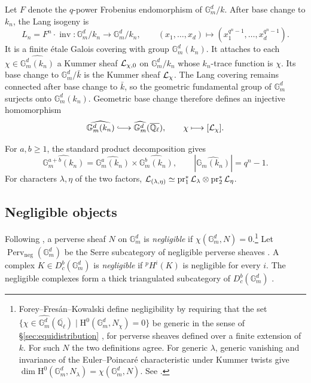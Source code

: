 \documentclass[12pt,reqno]{amsart}
\theoremstyle{definition}
\theoremstyle{plain}
\theoremstyle{definition}
\theoremstyle{remark}
\newcommand{\bbG}{\mathbb{G}}  \newcommand{\bbH}{\mathbb{H}}
\newcommand{\bbQ}{\mathbb{Q}}  \newcommand{\bbR}{\mathbb{R}}
\newcommand{\HH}{\mathrm{H}}  \newcommand{\JJ}{\mathrm{J}}
\newcommand{\ol}[1]{\overline{#1}}
\newcommand{\Ql}{\bbQ_{\ell}}
\newcommand{\Db}{D^b_c}
\newcommand{\Gm}{\bbG_m}
\newcommand{\Perv}{\operatorname{Perv}}
\begin{document}
Let \(F\) denote the \(q\)-power Frobenius endomorphism of \(\Gm^d/k\).  After base change to \(k_n\), the
Lang isogeny is
\[
        L_n=F^n\cdot\operatorname{inv}\colon\Gm^d/k_n\longrightarrow\Gm^d/k_n,
        \qquad
        (x_1,\ldots,x_d)\longmapsto(x_1^{q^n-1},\ldots,x_d^{q^n-1}).
\]
It is a finite \'etale Galois covering with group \(\Gm^d(k_n)\).  It attaches to each
\(\chi\in\widehat{\Gm^d(k_n)}\) a Kummer sheaf \(\mathcal{L}_{\chi,0}\) on \(\Gm^d/k_n\) whose \(k_n\)-trace
function is \(\chi\).  Its base change to \(\Gm^d/\bar k\) is the Kummer sheaf \(\mathcal{L}_\chi\).  The Lang
covering remains connected after base change to \(\bar k\), so the geometric fundamental group of
\(\Gm^d\) surjects onto \(\Gm^d(k_n)\).  Geometric base change therefore defines an injective homomorphism
\[
        \widehat{\Gm^d(k_n)}\lhook\joinrel\longrightarrow\widehat{\Gm^d}(\ol\Ql),
        \qquad
        \chi\longmapsto[\cL_\chi].
\]

For \(a,b\ge1\), the standard product decomposition gives
\[
        \widehat{\Gm^{a+b}(k_n)}
        =\widehat{\Gm^a(k_n)}\times\widehat{\Gm^b(k_n)},
        \qquad
        |\widehat{\Gm(k_n)}|=q^n-1 .
\]
For characters \(\lambda,\eta\) of the two factors,
\(\mathcal{L}_{(\lambda,\eta)}\simeq\operatorname{pr}_1^*\mathcal{L}_\lambda\otimes\operatorname{pr}_2^*\mathcal{L}_\eta\).

\subsection{Negligible objects}
\label{sec:negligible}

Following \cite[\S3.6]{GabberLoeser1996}, a perverse sheaf \(N\) on \(\Gm^d\) is \emph{negligible} if
\(\chi(\Gm^d,N)=0\).\footnote{Forey--Fres\'an--Kowalski define negligibility by requiring that the set
\(\bigl\{\chi\in\widehat{\Gm^d}(\ol\Ql)\mid\HH^0(\Gm^d,N_\chi)=0\bigr\}\) be generic in the sense of
\S\ref{sec:equidistribution} \cite[Def.~3.4]{ForeyFresanKowalski2021}, for perverse sheaves
defined over a finite extension of \(k\).  For such \(N\) the two definitions agree.  For generic
\(\lambda\), generic vanishing and invariance of the Euler--Poincar\'e characteristic under Kummer
twists give \(\dim\HH^0(\Gm^d,N_\lambda)=\chi(\Gm^d,N)\).  See
\cite[Prop.~3.22(2)--(3)]{ForeyFresanKowalski2021}.}  Let
\(\Perv_{\mathrm{neg}}(\Gm^d)\) be the Serre subcategory of negligible perverse sheaves
\cite[Lem.~3.6.2]{GabberLoeser1996}.  A complex \(K\in\Db(\Gm^d)\) is \emph{negligible} if
\({}^pH^i(K)\) is negligible for every \(i\).  The negligible complexes form a thick triangulated
subcategory of \(\Db(\Gm^d)\)
\cite[Prop.~3.6.1(i)]{GabberLoeser1996}.
\end{document}
